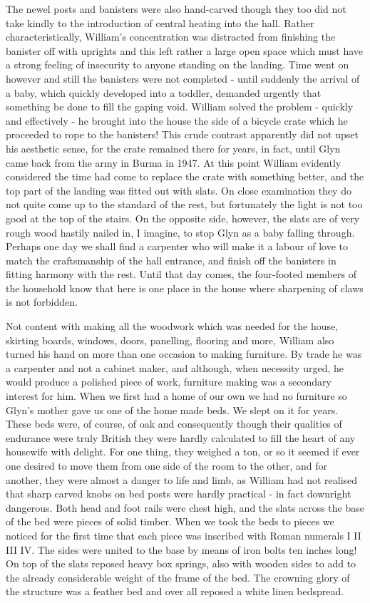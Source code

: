 The newel posts and banisters were also hand-carved though they too did not take kindly to the introduction of central heating into the hall. Rather characteristically, William's concentration was distracted from finishing the banister off with uprights and this left rather a large open space which must have a strong feeling of insecurity to anyone standing on the landing. Time went on however and still the banisters were not completed - until suddenly the arrival of a baby, which quickly developed into a toddler, demanded urgently that something be done to fill the gaping void. William solved the problem - quickly and effectively - he brought into the house the side of a bicycle crate which he proceeded to rope to the banisters! This crude contrast apparently did not upset his aesthetic sense, for the crate remained there for years, in fact, until Glyn came back from the army in Burma in 1947. At this point William evidently considered the time had come to replace the crate with something better, and the top part of the landing was fitted out with slats. On close examination they do not quite come up to the standard of the rest, but fortunately the light is not too good at the top of the stairs. On the opposite side, however, the slats are of very rough wood hastily nailed in, I imagine, to stop Glyn as a baby falling through. Perhaps one day we shall find a carpenter who will make it a labour of love to match the craftsmanship of the hall entrance, and finish off the banisters in fitting harmony with the rest. Until that day comes, the four-footed members of the household know that here is one place in the house where sharpening of claws is not forbidden.

Not content with making all the woodwork which was needed for the house, skirting boards, windows, doors, panelling, flooring and more, William also turned his hand on more than one occasion to making furniture. By trade he was a carpenter and not a cabinet maker, and although, when necessity urged, he would produce a polished piece of work, furniture making was a secondary interest for him. When we first had a home of our own we had no furniture so Glyn's mother gave us one of the home made beds. We slept on it for years. These beds were, of course, of oak and consequently though their qualities of endurance were truly British they were hardly calculated to fill the heart of any housewife with delight. For one thing, they weighed a ton, or so it seemed if ever one desired to move them from one side of the room to the other, and for another, they were almost a danger to life and limb, as William had not realised that sharp carved knobs on bed posts were hardly practical - in fact downright dangerous. Both head and foot rails were chest high, and the slats across the base of the bed were pieces of solid timber. When we took the beds to pieces we noticed for the first time that each piece was inscribed with Roman numerals I II III IV. The sides were united to the base by means of iron bolts ten inches long! On top of the slats reposed heavy box springs, also with wooden sides to add to the already considerable weight of the frame of the bed. The crowning glory of the structure was a feather bed and over all reposed a white linen bedspread.

